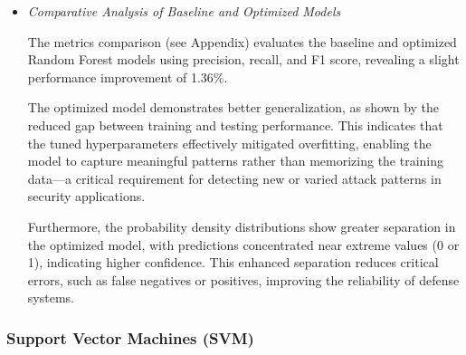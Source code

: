 \begin{itemize}

                \vspace{0.5em}

                \item \textit{Comparative Analysis of Baseline and Optimized Models}
                
                    \vspace{0.3em}

                        The metrics comparison (see Appendix) evaluates the baseline and optimized Random Forest models using precision, recall, and F1 score, revealing a slight performance improvement of 1.36\%.

                        The optimized model demonstrates better generalization, as shown by the reduced gap between training and testing performance. This indicates that the tuned hyperparameters effectively mitigated overfitting, enabling the model to capture meaningful patterns rather than memorizing the training data—a critical requirement for detecting new or varied attack patterns in security applications.

                        Furthermore, the probability density distributions show greater separation in the optimized model, with predictions concentrated near extreme values (0 or 1), indicating higher confidence. This enhanced separation reduces critical errors, such as false negatives or positives, improving the reliability of defense systems.

                
            \end{itemize}

        \subsubsection{Support Vector Machines (SVM)}
        
